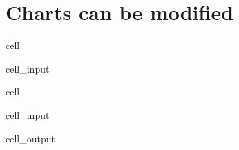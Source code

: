 \documentclass[letterpaper,10pt,english]{jupyterBook}
\begin{document}
\section{Charts can be modified}
\label{\detokenize{content/howto/keep/Create and modify charts with keep_plot:charts-can-be-modified}}
\begin{sphinxuseclass}{cell}\begin{sphinxVerbatimInput}

\begin{sphinxuseclass}{cell_input}
\begin{sphinxVerbatim}[commandchars=\\\{\}]
  \PYG{p}{[}\PYG{p}{]}
\end{sphinxVerbatim}

\end{sphinxuseclass}\end{sphinxVerbatimInput}

\end{sphinxuseclass}
\begin{sphinxuseclass}{cell}\begin{sphinxVerbatimInput}

\begin{sphinxuseclass}{cell_input}
\begin{sphinxVerbatim}[commandchars=\\\{\}]
\PYG{p}{[}\PYG{p}{]}
\PYG{p}{[}\PYG{p}{]}
\PYG{p}{[}\PYG{p}{]}
\PYG{p}{[}\PYG{p}{]}
\end{sphinxVerbatim}

\end{sphinxuseclass}\end{sphinxVerbatimInput}
\begin{sphinxVerbatimOutput}

\begin{sphinxuseclass}{cell_output}
\noindent{}

\end{sphinxuseclass}\end{sphinxVerbatimOutput}

\end{sphinxuseclass}
\end{document}
